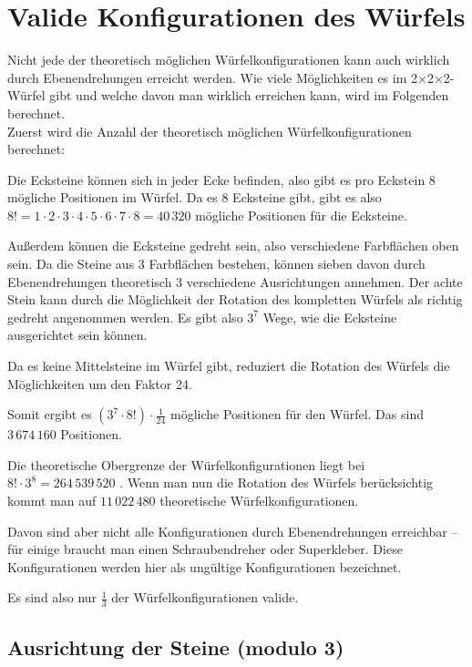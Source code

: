 \documentclass[12pt,a4paper, usenames, dvipsnames]{article}
\newcommand{\Ttwo}{2$\times$2$\times$2-}
\begin{document}
\section{Valide Konfigurationen des Würfels}

Nicht jede der theoretisch möglichen Würfelkonfigurationen kann auch wirklich durch Ebenendrehungen erreicht werden. Wie viele Möglichkeiten es im \Ttwo Würfel gibt und welche davon man wirklich erreichen kann, wird im Folgenden berechnet. \\


Zuerst wird die Anzahl der theoretisch möglichen Würfelkonfigurationen berechnet:


Die Ecksteine können sich in jeder Ecke befinden, also gibt es pro Eckstein 8 mögliche Positionen im Würfel. Da es 8 Ecksteine gibt, gibt es also $8! = 1 \cdot 2 \cdot 3 \cdot 4 \cdot 5 \cdot 6 \cdot 7 \cdot 8 = 40\, 320$ mögliche Positionen für die Ecksteine.


Außerdem können die Ecksteine gedreht sein, also verschiedene Farbflächen oben sein. Da die Steine aus 3 Farbflächen bestehen, können sieben davon durch Ebenendrehungen theoretisch 3 verschiedene Ausrichtungen annehmen. Der achte Stein kann durch die Möglichkeit der Rotation des kompletten Würfels als richtig gedreht angenommen werden. Es gibt also $3^7$ Wege, wie die Ecksteine ausgerichtet sein können.


Da es keine Mittelsteine im Würfel gibt, reduziert die Rotation des Würfels die Möglichkeiten um den Faktor 24. 


Somit ergibt es $(3^7 \cdot 8!) \cdot \frac{1}{24}$ mögliche Positionen für den Würfel. Das sind $3\, 674\, 160$ Positionen.


Die theoretische Obergrenze der Würfelkonfigurationen liegt bei $8! \cdot 3^8 = 264 \, 539 \, 520$ \cite{MMFAA}. Wenn man nun die Rotation des Würfels berücksichtig kommt man auf $11 \, 022 \, 480$ theoretische Würfelkonfigurationen.


Davon sind aber nicht alle Konfigurationen durch Ebenendrehungen erreichbar -- für einige braucht man einen Schraubendreher oder Superkleber. Diese Konfigurationen werden hier als ungültige Konfigurationen bezeichnet. 


Es sind also nur $\frac{1}{3}$ der Würfelkonfigurationen valide.
%
%
%
%
%
%
%
%
%
%
%
%
%
%
%
%
%
%
%
%
\subsection*{Ausrichtung der Steine (modulo 3)}
\end{document}
